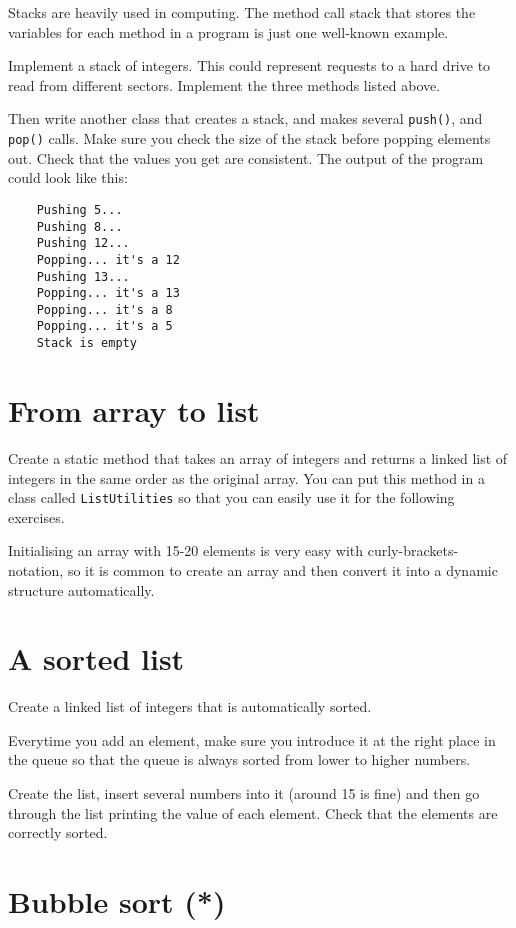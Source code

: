 \documentclass{article}
\begin{document}
Stacks are heavily used in computing. The method call stack that
stores the variables for each method in a program is just one
well-known example. 

Implement a stack of integers. This could represent requests
to a hard drive to read from different sectors. Implement the three
methods listed above. 

Then write another class that creates a stack, and makes several
\verb+push()+, and \verb+pop()+ calls. Make sure you check the size of
the stack before popping elements out. Check
that the values you get are consistent. The output of the program
could look like this: 

\begin{verbatim}
    Pushing 5...
    Pushing 8...
    Pushing 12...
    Popping... it's a 12
    Pushing 13...
    Popping... it's a 13
    Popping... it's a 8
    Popping... it's a 5
    Stack is empty
\end{verbatim}

\section{From array to list}
\label{sec:from-array-string}

Create a static method that takes an array of integers and returns a
linked list of integers in the same order as the original array. You
can put this method in a class called \verb+ListUtilities+ so that you
can easily use it for the following exercises. 

Initialising an array with 15-20 elements is very easy with
curly-brackets-notation, so it is 
common to create an array and then convert it into a dynamic structure
automatically. 

\section{A sorted list}
\label{sec:sorted-list}

Create a linked list of integers that is automatically sorted. 

Everytime you add an element, make sure you introduce it at the right
place in the queue so that the queue is always sorted from lower to
higher numbers. 

Create the list, insert several numbers into it (around 15 is fine)
and then go through the list printing the value of each element. Check
that the elements are correctly sorted.


\section{Bubble sort (*)}
\label{sec:bubble-sort}
\end{document}
